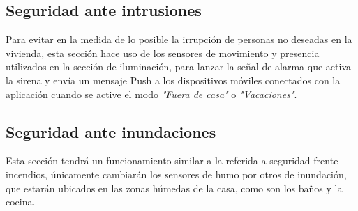 \subsection{Seguridad ante intrusiones }Para evitar en la medida de lo posible la irrupción de personas no deseadas en la vivienda, esta sección hace uso de los sensores de movimiento y presencia utilizados en la sección de iluminación, para lanzar la señal de alarma que activa la sirena y envía un mensaje Push a los dispositivos móviles conectados con la aplicación cuando se active el modo \textit{"Fuera de casa"} o \textit{"Vacaciones"}.\\
\subsection{Seguridad ante inundaciones}Esta sección tendrá un funcionamiento similar a la referida a seguridad frente incendios, únicamente cambiarán los sensores de humo por otros de inundación, que estarán ubicados en las zonas húmedas de la casa, como son los baños y la cocina.\\
